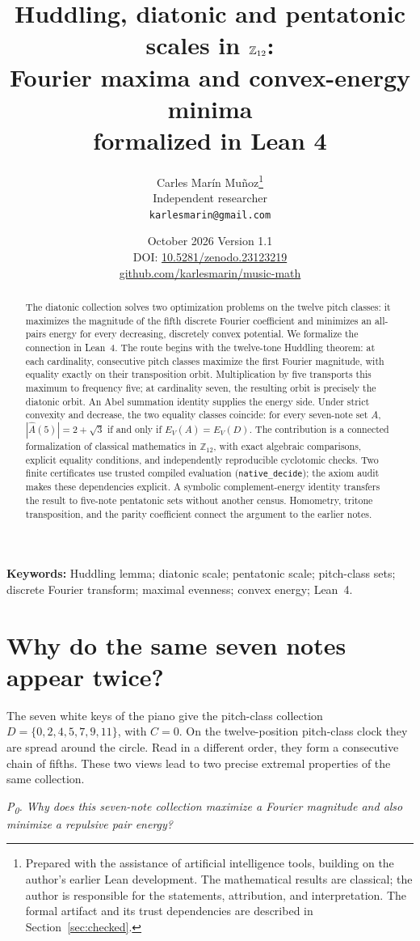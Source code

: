 \documentclass[11pt]{article}
\title{\bf Huddling, diatonic and pentatonic scales in $\Ztwelve$:\\
Fourier maxima and convex-energy minima\\ formalized in Lean 4}
\author{Carles Mar\'in Mu\~noz\thanks{Prepared with the assistance of artificial intelligence tools,
building on the author's earlier Lean development. The mathematical results are classical;
the author is responsible for the statements, attribution, and interpretation.
The formal artifact and its trust dependencies are described in Section~\ref{sec:checked}.}\\[3pt]
\normalsize Independent researcher\\
\normalsize \texttt{karlesmarin@gmail.com}}
\date{October 2026 \quad\textbullet\quad Version 1.1\\[3pt]\normalsize DOI: \href{https://doi.org/10.5281/zenodo.23123219}{10.5281/zenodo.23123219}\\\href{https://github.com/karlesmarin/music-math}{github.com/karlesmarin/music-math}}
\newcommand{\lean}[1]{\texttt{#1}}
\newcommand{\Ztwelve}{\mathbb{Z}_{12}}
\newcommand{\Ahat}{\widehat A}
\newcommand{\question}[1]{\smallskip\noindent\textit{#1}\smallskip}
\begin{document}
\maketitle
\begin{abstract}\noindent
The diatonic collection solves two optimization problems on the twelve pitch classes:
it maximizes the magnitude of the fifth discrete Fourier coefficient and minimizes an
all-pairs energy for every decreasing, discretely convex potential. We formalize the
connection in Lean~4. The route begins with the twelve-tone Huddling theorem: at each
cardinality, consecutive pitch classes maximize the first Fourier magnitude, with equality
exactly on their transposition orbit. Multiplication by five transports this maximum to
frequency five; at cardinality seven, the resulting orbit is precisely the diatonic orbit.
An Abel summation identity supplies the energy side. Under strict convexity and decrease,
the two equality classes coincide: for every seven-note set $A$,
$|\Ahat(5)|=2+\sqrt3$ if and only if $E_V(A)=E_V(D)$.
The contribution is a connected formalization of classical mathematics in $\Ztwelve$,
with exact algebraic comparisons, explicit equality conditions, and independently
reproducible cyclotomic checks. Two finite certificates use trusted compiled evaluation
(\lean{native\_decide}); the axiom audit makes these dependencies explicit.
A symbolic complement-energy identity transfers the
result to five-note pentatonic sets without another census. Homometry, tritone
transposition, and the parity coefficient connect the argument to the earlier notes.
\end{abstract}
\smallskip\noindent\textbf{Keywords:} Huddling lemma; diatonic scale; pentatonic scale; pitch-class sets;
discrete Fourier transform; maximal evenness; convex energy; Lean~4.

\section{Why do the same seven notes appear twice?}\label{sec:hook}

The seven white keys of the piano give the pitch-class collection
$D=\{0,2,4,5,7,9,11\}$, with $C=0$. On the twelve-position pitch-class clock they are spread
around the circle. Read in a different order, they form a consecutive chain of fifths.
These two views lead to two precise extremal properties of the same collection.

\question{P\textsubscript{0}. Why does this seven-note collection maximize a Fourier magnitude
and also minimize a repulsive pair energy?}
\end{document}
